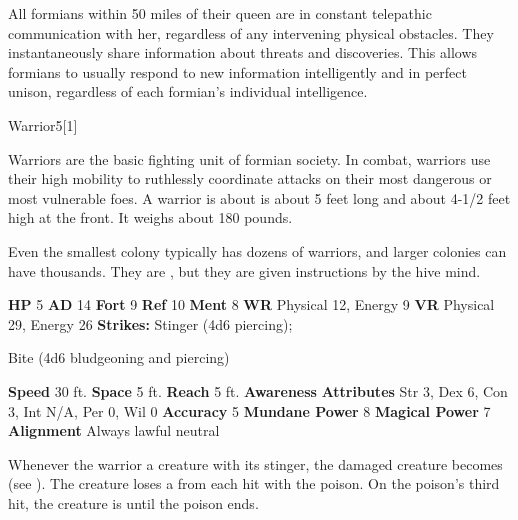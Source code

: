         All formians within 50 miles of their queen are in constant telepathic communication with her, regardless of any intervening physical obstacles.
        They instantaneously share information about threats and discoveries.
        This allows formians to usually respond to new information intelligently and in perfect unison, regardless of each formian's individual intelligence.
  

  \begin{monsubsection}{Warrior}{5}[1]
    \vspace{-1em}\vspace{-1em}
    \vspace{0em}

    
          Warriors are the basic fighting unit of formian society.
          In combat, warriors use their high mobility to ruthlessly coordinate attacks on their most dangerous or most vulnerable foes.
          A warrior is about is about 5 feet long and about 4-1/2 feet high at the front.
          It weighs about 180 pounds.
        
          Even the smallest colony typically has dozens of warriors, and larger colonies can have thousands.
          They are , but they are given instructions by the hive mind.
        

    \begin{spellcontent}
      \begin{spelltargetinginfo}
        \pari \textbf{HP} 5 \monsep
          \textbf{AD} 14 \monsep
          \textbf{Fort} 9 \monsep
          \textbf{Ref} 10 \monsep
          \textbf{Ment} 8
        \pari \textbf{WR} Physical 12, Energy 9 \monsep
        \textbf{VR} Physical 29, Energy 26
        \pari \textbf{Strikes:}
            Stinger  (4d6 piercing);
\par Bite  (4d6 bludgeoning and piercing)
      \end{spelltargetinginfo}
    \end{spellcontent}
    \begin{monsterfooter}
      \pari \textbf{Speed} 30 ft. \monsep
        \textbf{Space} 5 ft. \monsep
        \textbf{Reach} 5 ft.
      \pari \textbf{Awareness} 
      \pari \textbf{Attributes}
        Str 3, Dex 6,
        Con 3, Int N/A,
        Per 0, Wil 0
      \pari \textbf{Accuracy} 5 \monsep
        \textbf{Mundane Power} 8 \monsep
      \textbf{Magical Power} 7
      \pari \textbf{Alignment} Always lawful neutral
    \end{monsterfooter}
  \end{monsubsection}
            Whenever the warrior  a creature with its stinger, the damaged creature becomes  (see ).
            The creature loses a  from each hit with the poison.
            On the poison's third hit, the creature is  until the poison ends.
  
